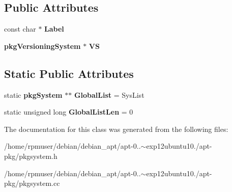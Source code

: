 \subsection*{\-Public \-Attributes}
\begin{DoxyCompactItemize}
\item 
const char $\ast$ {\bfseries \-Label}\label{classpkgSystem_a2c28600dbc88e9535c6e44b111829cc2}

\item 
{\bf pkg\-Versioning\-System} $\ast$ {\bfseries \-V\-S}\label{classpkgSystem_a3f4191ee956a08d06a8aecf064d03c1e}

\end{DoxyCompactItemize}
\subsection*{\-Static \-Public \-Attributes}
\begin{DoxyCompactItemize}
\item 
static {\bf pkg\-System} $\ast$$\ast$ {\bfseries \-Global\-List} = \-Sys\-List\label{classpkgSystem_a542925237c099179536321affde78ea6}

\item 
static unsigned long {\bfseries \-Global\-List\-Len} = 0\label{classpkgSystem_acdd1750df964c2a94afe622abfe15d7b}

\end{DoxyCompactItemize}


\-The documentation for this class was generated from the following files\-:\begin{DoxyCompactItemize}
\item 
/home/rpmuser/debian/debian\-\_\-apt/apt-\/0..$\sim$exp12ubuntu10./apt-\/pkg/pkgsystem.\-h\item 
/home/rpmuser/debian/debian\-\_\-apt/apt-\/0..$\sim$exp12ubuntu10./apt-\/pkg/pkgsystem.\-cc\end{DoxyCompactItemize}
